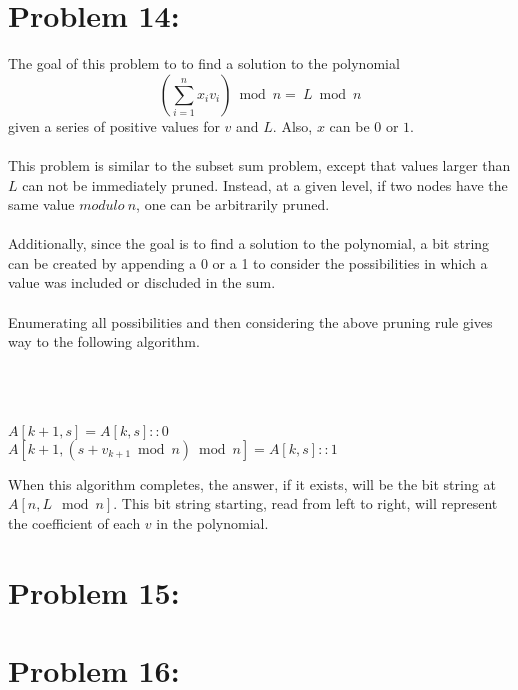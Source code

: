 \documentclass[12pt]{article}
\begin{document}
\section*{Problem 14: }
The goal of this problem to to find a 
solution to the polynomial \[\left(\sum_{i=1}^{n}x_iv_i\right)\bmod n=\ L\bmod n\]
given a series of positive values for $v$ and $L$.  Also, $x$
can be $0$ or $1$.\\\\  
This problem is similar to the subset sum problem, except that
values larger than $L$ can not be immediately pruned.
Instead, at a given level, if two nodes have the same value 
$modulo\ n$, one can be arbitrarily pruned.\\\\
Additionally, since the goal is to find a solution to the
polynomial, a bit string can be created by appending a 0 or a 1
to consider the
possibilities in which a value was included or discluded in
the sum.\\\\
Enumerating all possibilities and then considering the 
above pruning rule gives way to the following algorithm.\\\\
\begin{algorithm}[H]
\\
\\
{
{
{
   $A[k+1,s] = A[k,s]::0$\\
   $A[k+1, (s + v_{k+1}\bmod n)\bmod n] = A[k,s]::1$\\
}
}
}
\end{algorithm}
When this algorithm completes, the answer, if it exists,
will be the bit string at $A[n,L\mod n]$.  This bit string
starting, read from left to right, will represent the 
coefficient of each $v$ in the polynomial.
\section*{Problem 15: }
\section*{Problem 16: }
\end{document}
